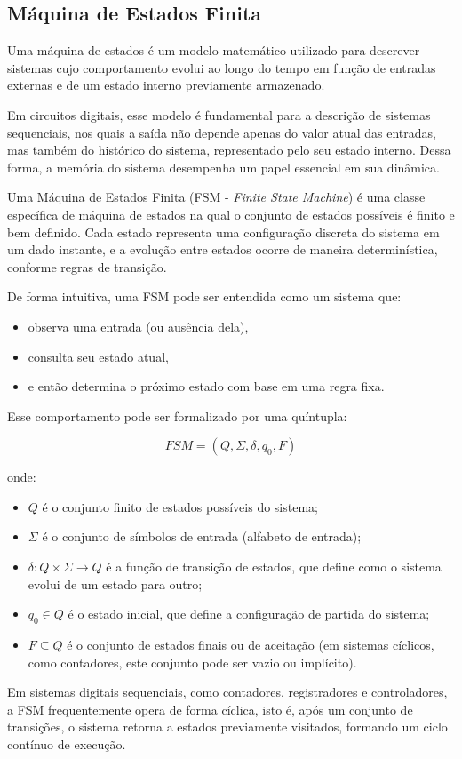 \subsection{Máquina de Estados Finita}
\label{sec:fsm}

Uma máquina de estados é um modelo matemático utilizado para descrever sistemas cujo comportamento evolui ao longo do tempo em função de entradas externas e de um estado interno previamente armazenado.

Em circuitos digitais, esse modelo é fundamental para a descrição de sistemas sequenciais, nos quais a saída não depende apenas do valor atual das entradas, mas também do histórico do sistema, representado pelo seu estado interno. Dessa forma, a memória do sistema desempenha um papel essencial em sua dinâmica.

Uma Máquina de Estados Finita (FSM - \textit{Finite State Machine}) é uma classe específica de máquina de estados na qual o conjunto de estados possíveis é finito e bem definido. Cada estado representa uma configuração discreta do sistema em um dado instante, e a evolução entre estados ocorre de maneira determinística, conforme regras de transição.

De forma intuitiva, uma FSM pode ser entendida como um sistema que:
\begin{itemize}
    \item observa uma entrada (ou ausência dela),
    \item consulta seu estado atual,
    \item e então determina o próximo estado com base em uma regra fixa.
\end{itemize}

Esse comportamento pode ser formalizado por uma quíntupla:

\[
FSM = (Q, \Sigma, \delta, q_0, F)
\]

onde:

\begin{itemize}
    \item $Q$ é o conjunto finito de estados possíveis do sistema;
    \item $\Sigma$ é o conjunto de símbolos de entrada (alfabeto de entrada);
    \item $\delta : Q \times \Sigma \rightarrow Q$ é a função de transição de estados, que define como o sistema evolui de um estado para outro;
    \item $q_0 \in Q$ é o estado inicial, que define a configuração de partida do sistema;
    \item $F \subseteq Q$ é o conjunto de estados finais ou de aceitação (em sistemas cíclicos, como contadores, este conjunto pode ser vazio ou implícito).
\end{itemize}

Em sistemas digitais sequenciais, como contadores, registradores e controladores, a FSM frequentemente opera de forma cíclica, isto é, após um conjunto de transições, o sistema retorna a estados previamente visitados, formando um ciclo contínuo de execução.
